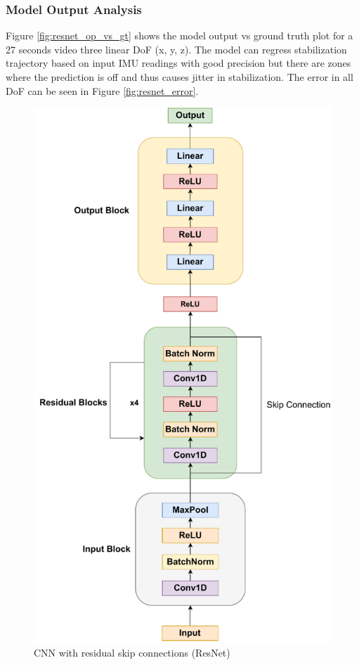 \subsubsection{Model Output Analysis}
Figure \ref{fig:resnet_op_vs_gt} shows the model output vs ground truth plot for a 27 seconds video three linear DoF (x, y, z). The model can regress stabilization trajectory based on input IMU readings with good precision but there are zones where the prediction is off and thus causes jitter in stabilization. The error in all DoF can be seen in Figure \ref{fig:resnet_error}.

\begin{figure}[H]
    \centering
    \includegraphics[scale=0.6]{images/fig_chapter2/nns/resnet_mt.pdf}
    \caption{CNN with residual skip connections (ResNet)}
    \label{fig:resnet_used}
\end{figure}

